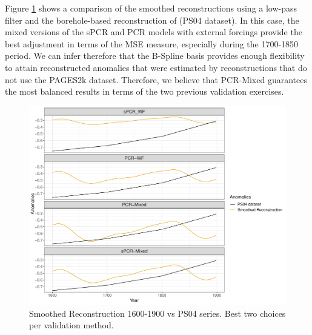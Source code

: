 \documentclass[12pt]{amsart}
\theoremstyle{plain}
\theoremstyle{definition}
\theoremstyle{remark}
\begin{document}
Figure \ref{fig:paleo15001} shows a comparison of the smoothed reconstructions
using a low-pass filter and the borehole-based reconstruction of
\cite{Pollack2004} (PS04 dataset). In this case, the mixed versions of the sPCR
and PCR models with external forcings provide the best adjustment in terms of
the MSE measure, especially during the 1700-1850 period. We can infer therefore
that the B-Spline basis provides enough flexibility to attain reconstructed
anomalies that were estimated by reconstructions that do not use the PAGES2k
dataset. Therefore, we believe that PCR-Mixed guarantees the most balanced
results in terms of the two previous validation exercises.

\begin{figure}
  \centering
  \includegraphics[scale=0.55]{Rec1500_Final}
  \caption{Smoothed Reconstruction 1600-1900 vs PS04 series. Best two choices per validation method.}
  \label{fig:paleo15001}
\end{figure}
\end{document}
